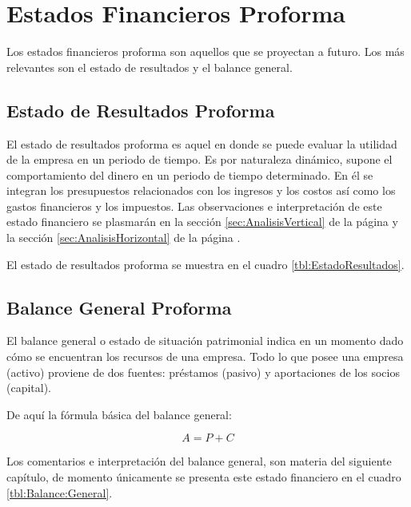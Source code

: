 \section{Estados Financieros Proforma}

Los estados financieros proforma son aquellos que se proyectan a futuro. Los más relevantes son el estado de resultados y el balance general.

\subsection{Estado de Resultados Proforma}

El estado de resultados proforma es aquel en donde se puede evaluar la utilidad de la empresa en un periodo de tiempo. Es por naturaleza dinámico, supone el comportamiento del dinero en un periodo de tiempo determinado. En él se integran los presupuestos relacionados con los ingresos y los costos así como los gastos financieros y los impuestos. Las observaciones e interpretación de este estado financiero se plasmarán en la sección \ref{sec:AnalisisVertical} de la página \pageref{sec:AnalisisVertical} y la sección \ref{sec:AnalisisHorizontal} de la página \pageref{sec:AnalisisHorizontal}.

El estado de resultados proforma se muestra en el cuadro \ref{tbl:EstadoResultados}.

\subsection{Balance General Proforma}

El balance general o estado de situación patrimonial indica en un momento dado cómo se encuentran los recursos de una empresa. Todo lo que posee una empresa (activo) proviene de dos fuentes: préstamos (pasivo) y aportaciones de los socios (capital).

De aquí la fórmula básica del balance general:

$$ A = P + C $$

Los comentarios e interpretación del balance general, son materia del siguiente capítulo, de momento únicamente se presenta este estado financiero en el cuadro \ref{tbl:Balance:General}.




